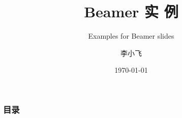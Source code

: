 \documentclass[12pt,UTF8,aspectratio=169]{beamer}
\begin{document}

\author{\myfont 李小飞}
\title{\textbf{\Huge Beamer 实 例}}
\subtitle{Examples for Beamer slides}
\date{\today}

    \frame[plain]{\titlepage}
   \begin{frame}
        \frametitle{目录}
        \tableofcontents
    \end{frame}


%
%
%
%  
%  
%  
\end{document}
